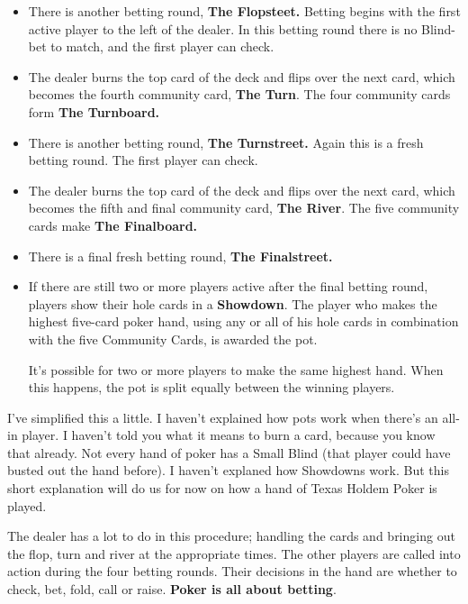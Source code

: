 \begin{itemize}
\item There is another betting round, \textbf{The Flopsteet.} Betting
  begins with the first
  active player to the left of the dealer. In this betting round there
  is no Blind-bet to match, and the first player can check.

\item The dealer burns the top card of the deck and flips over the
  next card, which becomes the fourth community card, \textbf{The
    Turn}. The four community cards form \textbf{The Turnboard.}

\item There is another betting round, \textbf{The Turnstreet.} Again
  this is a fresh betting round. The first player can check.

\item The dealer burns the top card of the deck and flips over the
  next card, which becomes the fifth and final community card, \textbf{The
    River}. The five community cards make \textbf{The Finalboard.}

\item There is a final fresh betting round, \textbf{The Finalstreet.}

\item If there are still two or more players active after the final
  betting round, players show their hole cards in a \textbf{Showdown}.
  The player who makes the highest five-card poker hand, using any or
  all of his hole cards in combination with the five Community Cards,
  is awarded the pot.

  It's possible for two or more players to make the same highest
  hand. When this happens, the pot is split equally between the
  winning players.

\end{itemize}

I've simplified this a little. I haven't explained how pots work when
there's an all-in player. I haven't told you what it means to burn a
card, because you know that already. Not every hand of poker has
a Small Blind (that player could have busted out the hand before). I
haven't explaned how Showdowns work. But this short explanation will
do us for now on how a hand of Texas Holdem Poker is played.

The dealer has a lot to do in this procedure; handling the cards and
bringing out the flop, turn and river at the appropriate times. The
other players are called into action during the four betting
rounds. Their decisions in the hand are whether to check, bet, fold,
call or raise. \textbf{Poker is all about betting}.
